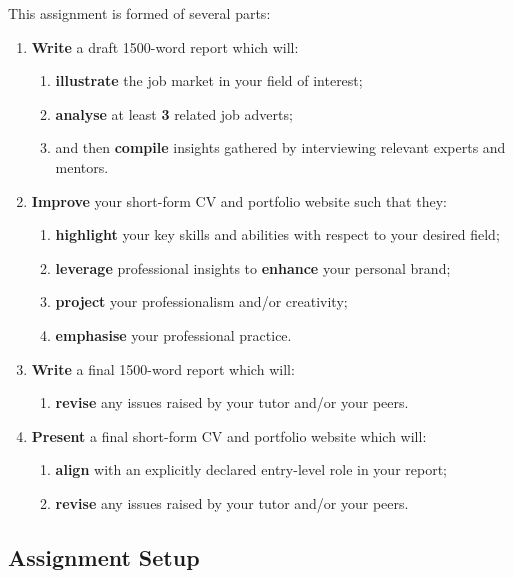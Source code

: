 \documentclass{../../fal_assignment}
\newcommand{\essayWordCount}{1500}
\newcommand{\minReferenceCount}{3}
\begin{document}
This assignment is formed of several parts:

\begin{enumerate}[label=(\Alph*)]
    \item \textbf{Write} a draft \essayWordCount-word report which will:
    	\begin{enumerate}[label=\roman*.]
    		\item \textbf{illustrate} the job market in your field of interest;
    		\item \textbf{analyse} at least \textbf{\minReferenceCount} related job adverts;
       		\item and then \textbf{compile} insights gathered by interviewing relevant experts and mentors. 		
	\end{enumerate}
    \item \textbf{Improve} your short-form CV and portfolio website such that they:
    	\begin{enumerate}[label=\roman*.]
    		\item \textbf{highlight} your key skills and abilities with respect to your desired field;
    		\item \textbf{leverage} professional insights to \textbf{enhance} your personal brand;
    		\item \textbf{project} your professionalism and/or creativity;
    		\item \textbf{emphasise} your professional practice.
	\end{enumerate}
    \item \textbf{Write} a final \essayWordCount-word report which will:
    	\begin{enumerate}[label=\roman*.]
    		\item \textbf{revise} any issues raised by your tutor and/or your peers.
	\end{enumerate}
    \item \textbf{Present} a final short-form CV and portfolio website which will:
    	\begin{enumerate}[label=\roman*.]
    		\item \textbf{align} with an explicitly declared entry-level role in your report;
    		\item \textbf{revise} any issues raised by your tutor and/or your peers.
	\end{enumerate}
\end{enumerate}

\subsection*{Assignment Setup}
\end{document}
